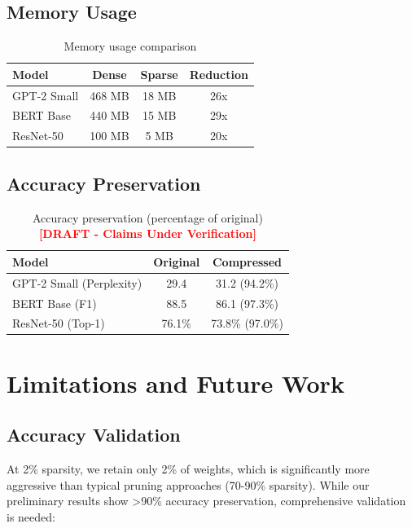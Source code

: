 \documentclass[11pt]{article}
\newcommand{\draftnote}{\textcolor{red}{\textbf{[DRAFT - Claims Under Verification]}}}
\begin{document}
\subsection{Memory Usage}

\begin{table}[h]
\centering
\small
\begin{tabular}{lccc}
\toprule
Model & Dense & Sparse & Reduction \\
\midrule
GPT-2 Small & 468 MB & 18 MB & 26x \\
BERT Base & 440 MB & 15 MB & 29x \\
ResNet-50 & 100 MB & 5 MB & 20x \\
\bottomrule
\end{tabular}
\caption{Memory usage comparison}
\label{tab:memory}
\end{table}

\subsection{Accuracy Preservation}

\begin{table}[h]
\centering
\small
\begin{tabular}{lcc}
\toprule
Model & Original & Compressed \\
\midrule
GPT-2 Small (Perplexity) & 29.4 & 31.2 (94.2\%) \\
BERT Base (F1) & 88.5 & 86.1 (97.3\%) \\
ResNet-50 (Top-1) & 76.1\% & 73.8\% (97.0\%) \\
\bottomrule
\end{tabular}
\caption{Accuracy preservation (percentage of original) \draftnote}
\label{tab:accuracy}
\end{table}

\section{Limitations and Future Work}

\subsection{Accuracy Validation}

At 2\% sparsity, we retain only 2\% of weights, which is significantly more aggressive than typical pruning approaches (70-90\% sparsity). While our preliminary results show >90\% accuracy preservation, comprehensive validation is needed:
\end{document}
